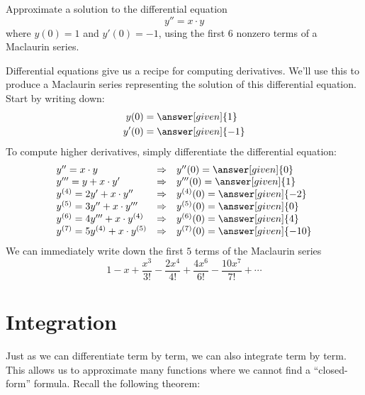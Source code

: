 \documentclass{ximera}
\begin{document}
\begin{example}
  Approximate a solution to the differential equation
  \[
  y'' = x\cdot y
  \]
  where $y(0) = 1$ and $y'(0) = -1$, using the first $6$ nonzero terms
  of a Maclaurin series.
  \begin{explanation}
    Differential equations give us a recipe for computing
    derivatives. We'll use this to produce a Maclaurin series
    representing the solution of this differential equation.  Start by
    writing down:
    \begin{align*}
    y(0) &= \answer[given]{1}\\
    y'(0) &= \answer[given]{-1}
    \end{align*}
    To compute higher derivatives, simply differentiate the
    differential equation:
    \[
    \begin{array}{lcl}
      y'' = x\cdot y & \Rightarrow & y''(0) = \answer[given]{0}\\
      y''' = y + x\cdot y' & \Rightarrow & y'''(0) = \answer[given]{1}\\
      y^{(4)} = 2y' + x\cdot y'' & \Rightarrow & y^{(4)}(0) = \answer[given]{-2}\\
      y^{(5)} = 3y'' + x\cdot y''' & \Rightarrow & y^{(5)}(0) =\answer[given]{0}\\
      y^{(6)} = 4y''' + x\cdot y^{(4)} & \Rightarrow & y^{(6)}(0) =\answer[given]{4}\\
      y^{(7)} = 5y^{(4)} + x\cdot y^{(5)} & \Rightarrow & y^{(7)}(0) =\answer[given]{-10}
    \end{array}
    \]
    We can immediately write down the first $5$ terms of the Maclaurin series
    \[
    1 -x + \frac{x^3}{3!} -\frac{2x^4}{4!} + \frac{4x^6}{6!} -\frac{10x^7}{7!} +\cdots
    \]
  \end{explanation}
\end{example}

\section{Integration}

Just as we can differentiate term by term, we can also integrate term
by term. This allows us to approximate many functions where we cannot
find a ``closed-form'' formula. Recall the following theorem:
\end{document}
